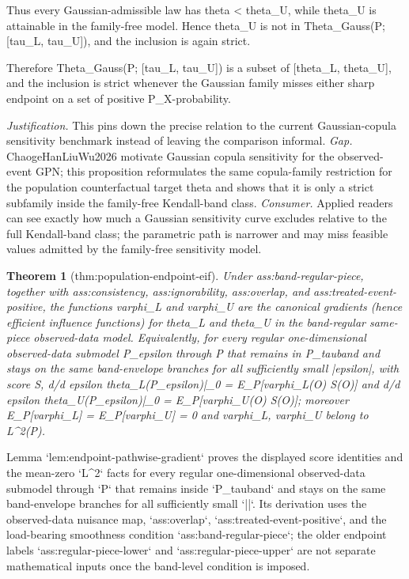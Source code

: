\documentclass{article}
\newtheorem{theorem}{Theorem}
\begin{document}
Thus every Gaussian-admissible law has theta < theta_U, while theta_U is attainable in the family-free model. Hence theta_U is not in Theta_Gauss(P; [tau_L, tau_U]), and the inclusion is again strict.

Therefore Theta_Gauss(P; [tau_L, tau_U]) is a subset of [theta_L, theta_U], and the inclusion is strict whenever the Gaussian family misses either sharp endpoint on a set of positive P_X-probability.
\par\smallskip\noindent \textit{Justification.} This pins down the precise relation to the current Gaussian-copula sensitivity benchmark instead of leaving the comparison informal. \textit{Gap.} ChaogeHanLiuWu2026 motivate Gaussian copula sensitivity for the observed-event GPN; this proposition reformulates the same copula-family restriction for the population counterfactual target theta and shows that it is only a strict subfamily inside the family-free Kendall-band class. \textit{Consumer.} Applied readers can see exactly how much a Gaussian sensitivity curve excludes relative to the full Kendall-band class; the parametric path is narrower and may miss feasible values admitted by the family-free sensitivity model.

\begin{theorem}[thm:population-endpoint-eif]\label{thm:population-endpoint-eif}
Under ass:band-regular-piece, together with ass:consistency, ass:ignorability, ass:overlap, and ass:treated-event-positive, the functions varphi_L and varphi_U are the canonical gradients (hence efficient influence functions) for theta_L and theta_U in the band-regular same-piece observed-data model. Equivalently, for every regular one-dimensional observed-data submodel {P_epsilon} through P that remains in P_tauband and stays on the same band-envelope branches for all sufficiently small |epsilon|, with score S, d/d epsilon theta_L(P_epsilon)|_0 = E_P[varphi_L(O) S(O)] and d/d epsilon theta_U(P_epsilon)|_0 = E_P[varphi_U(O) S(O)]; moreover E_P[varphi_L] = E_P[varphi_U] = 0 and varphi_L, varphi_U belong to L^2(P).
\end{theorem}
Lemma `lem:endpoint-pathwise-gradient` proves the displayed score identities and the mean-zero `L^2` facts for every regular one-dimensional observed-data submodel through `P` that remains inside `P_tauband` and stays on the same band-envelope branches for all sufficiently small `|\varepsilon|`. Its derivation uses the observed-data nuisance map, `ass:overlap`, `ass:treated-event-positive`, and the load-bearing smoothness condition `ass:band-regular-piece`; the older endpoint labels `ass:regular-piece-lower` and `ass:regular-piece-upper` are not separate mathematical inputs once the band-level condition is imposed.
\end{document}
